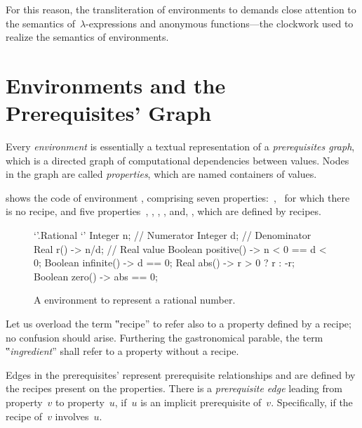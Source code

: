 For this reason, the transliteration of environments to \Java demands close
attention to the semantics of~$λ$-expressions and anonymous functions---the
\Java clockwork used to realize the semantics of environments.

\section{Environments and the Prerequisites' Graph}

Every \emph{environment} is essentially a textual representation of a
\emph{prerequisites graph}, which is a directed graph of computational
dependencies between values. Nodes in the graph are called \emph{properties},
which are named containers of values. 

 shows the \Reap code of environment ,
comprising seven properties:~,~ for which there is no recipe, and
five properties~, , , , and, ,
which are defined by recipes.

\begin{figure}\caption{\label{figure:rational}%
      A \Reap environment to represent a rational number.
    }
    \begin{adjustbox}{max width=\columnwidth}
\begin{reap}
`'.Rational {`'
  Integer n; // Numerator
  Integer d; // Denominator
  Real r() -> n/d; // Real value
  Boolean positive() -> n < 0 == d < 0;
  Boolean infinite() -> d == 0;
  Real abs() -> r > 0 ? r : -r;
  Boolean zero() -> abs == 0;
}
\end{reap}
\end{adjustbox}
\end{figure}

Let us overload the term ‟recipe” to refer also to a property defined by a
recipe; no confusion should arise. Furthering the gastronomical parable, the
term ‟\emph{ingredient}” shall refer to a property without a recipe.

Edges in the prerequisites' represent prerequisite relationships and are
defined by the recipes present on the properties. There is a \emph{prerequisite
edge} leading from property~$v$ to property~$u$, if~$u$ is an implicit
prerequisite of~$v$. Specifically, if the recipe of~$v$ involves~$u$.

